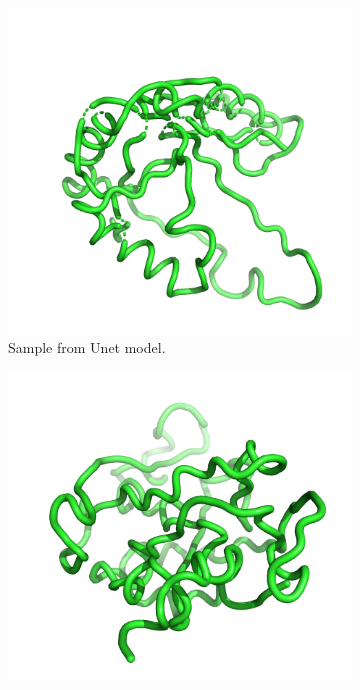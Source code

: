 \documentclass[a4paper,12pt]{article}
\begin{document}
\begin{figure}[htbp]
    \centering
    \begin{subfigure}[b]{0.495\textwidth}
        \centering
        \includegraphics[width=0.9\linewidth]{1ak6A00_gen_unet.png}
        \caption{Sample from Unet model.}
        \label{fig:sample-unet}
    \end{subfigure}
    \begin{subfigure}[b]{0.495\textwidth}
        \centering
        \includegraphics[width=\linewidth]{1ak6A00_gen_pos.png}

\end{subfigure}
\end{figure}
\end{document}
